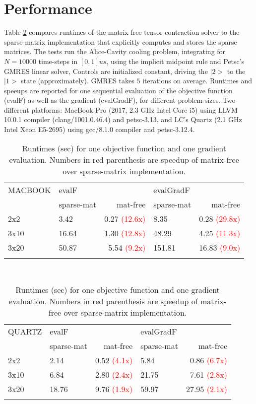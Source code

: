 \documentclass[letterpaper]{article}
\begin{document}
\section{Performance}
Table \ref{tab:runtime_qvsm} compares runtimes of the matrix-free tensor contraction solver to the sparse-matrix implementation that explicitly computes and stores the sparse matrices. The tests run the Alice-Cavity cooling problem, integrating for $N=10000$ time-steps in $[0,1]us$, using the implicit midpoint rule and Petsc's GMRES linear solver, Controls are initialized constant, driving the $|2>$ to the $|1>$ state (approximately). GMRES takes $5$ iterations on average. 
Runtimes and speeups are reported for one sequential evaluation of the objective function (evalF) as well as the gradient (evalGradF), for different problem sizes. Two different platforms: MacBook Pro (2017, 2.3 GHz Intel Core i5) using LLVM 10.0.1 compiler (clang/1001.0.46.4) and petsc-3.13, and LC's Quartz (2.1 GHz Intel Xeon E5-2695) using gcc/8.1.0 compiler and petsc-3.12.4.

\begin{table}[h]
  \begin{tabular}{l|lr|lr}
    \hline\noalign{\smallskip}
     MACBOOK    & evalF &    &  evalGradF &\\
                & sparse-mat & mat-free & sparse-mat& mat-free  \\
    \noalign{\smallskip}\hline\noalign{\smallskip}
    2x2  & 3.42   & 0.27 \textcolor{red}{(12.6x)}  & 8.35  &  0.28 \textcolor{red}{(29.8x)}  \\
    3x10 & 16.64  & 1.30  \textcolor{red}{(12.8x)} & 48.29 &  4.25 \textcolor{red}{(11.3x)}  \\
    3x20 &  50.87 & 5.54  \textcolor{red}{(9.2x)}  & 151.81 & 16.83 \textcolor{red}{ (9.0x)} \\
    \noalign{\smallskip}\hline
  \end{tabular}\\[2ex]
  \begin{tabular}{l|lr|lr}
    \hline\noalign{\smallskip}
     QUARTZ  & evalF &    &  evalGradF & \\
            & sparse-mat & mat-free & sparse-mat& mat-free  \\
    \noalign{\smallskip}\hline\noalign{\smallskip}
    2x2  &  2.14 & 0.52  \textcolor{red}{ (4.1x)} &  5.84 & 0.86 \textcolor{red}{ (6.7x)}  \\
    3x10 &  6.84 & 2.80  \textcolor{red}{ (2.4x)} & 21.75 & 7.61 \textcolor{red}{(2.8x)}   \\
    3x20 & 18.76 & 9.76  \textcolor{red}{(1.9x)}  & 59.97 & 27.95 \textcolor{red}{(2.1x)}  \\
    \noalign{\smallskip}\hline
  \end{tabular}
  \caption{Runtimes (sec) for one objective function and one gradient evaluation. Numbers in red parenthesis are speedup of matrix-free over sparse-matrix implementation.}
  \label{tab:runtime_qvsm} 
\end{table}
\end{document}
